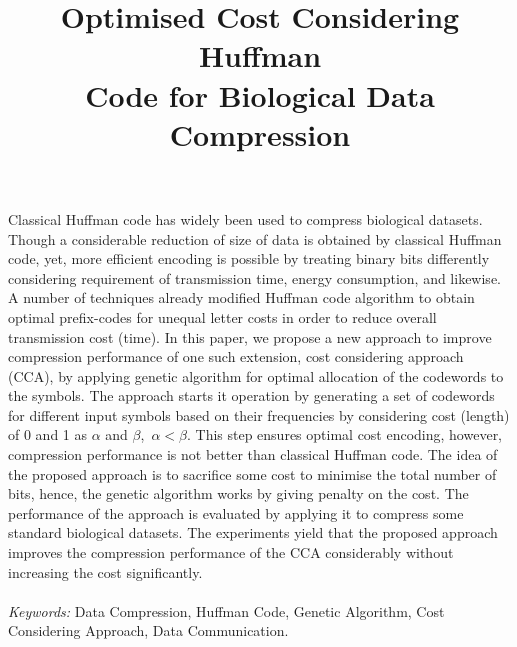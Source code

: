 \documentclass[twocolumn,12pt,a4paper]{article}
\begin{document}
\title{\huge\textbf{Optimised Cost Considering Huffman \\Code for Biological Data Compression}}

\date{}
\maketitle

\noindent
 {\scriptsize  Classical Huffman code has widely been used to compress biological datasets. Though a considerable reduction of size of data is obtained by classical Huffman code, yet, more efficient encoding is possible by treating binary bits differently considering requirement of transmission time, energy consumption, and likewise. A number of techniques already modified Huffman code algorithm to  obtain optimal prefix-codes for unequal letter costs in order to reduce overall transmission cost (time). In this paper, we propose a new approach to improve compression performance of one such extension, cost considering approach (CCA), by applying genetic algorithm for optimal allocation of the codewords to the symbols. The approach starts it operation by generating a set of codewords for different input symbols based on their frequencies by considering cost (length) of 0 and 1 as $\alpha$ and $\beta$,~$\alpha < \beta$. This step ensures optimal cost encoding, however, compression performance is not better than classical Huffman code. The idea of the proposed approach is to sacrifice some cost to minimise the total number of bits, hence, the genetic algorithm works by giving penalty on the cost. The performance of the approach is evaluated by applying it to compress some standard biological datasets. The experiments yield that the proposed approach improves the compression performance of the CCA considerably without increasing the cost significantly.\\ \\
\noindent
\textit{Keywords:}
Data Compression, Huffman Code, Genetic Algorithm, Cost Considering Approach, Data Communication.}
\end{document}
